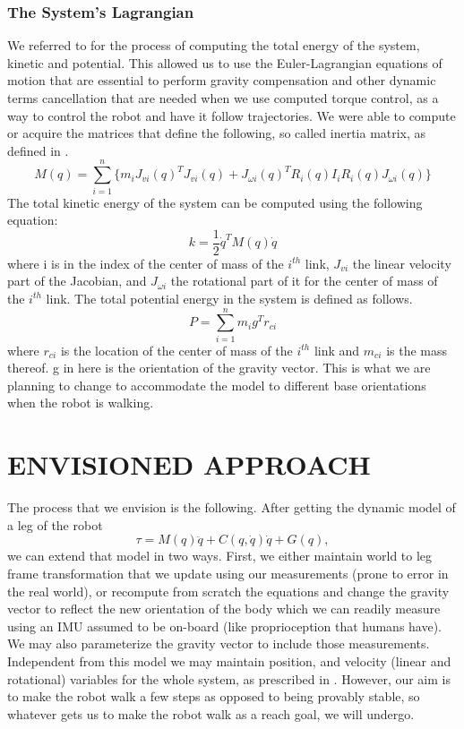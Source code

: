 \documentclass[letterpaper, 10 pt, conference]{ieeeconf}  %
\begin{document}
\subsubsection{The System's Lagrangian}
We referred to \cite{spong2006robot} for the process of computing the total energy of the system, kinetic and potential. This allowed us to use the Euler-Lagrangian equations of motion that are essential to perform gravity compensation and other dynamic terms cancellation that are needed when we use computed torque control, as a way to control the robot and have it follow trajectories.
We were able to compute or acquire the matrices that define the following, so called inertia matrix, as defined in \cite{spong2006robot}.
$$
M(q) = \sum_{i=1}^n \{m_i J_{vi}(q)^T J_{vi}(q) + J_{\omega i}(q)^T R_i(q) I_i R_i(q) J_{\omega i}(q)\}
$$
The total kinetic energy of the system can be computed using the following equation:
$$
k = \frac{1}{2} \dot{q}^T M(q)\dot{q}
$$
where i is in the index of the center of mass of the $i^{th}$ link, $J_{vi}$ the linear velocity part of the Jacobian, and  $J_{\omega i}$ the rotational part of it for the center of mass of the $i^{th}$ link.
The total potential energy in the system is defined as follows.
$$
P = \sum_{i=1}^n  m_i g^T r_{ci}
$$
where $r_{ci}$ is the location of the center of mass of the $i^{th}$ link and $m_{ci}$ is the mass thereof. g in here is the orientation of the gravity vector. This is what we are planning to change to accommodate the model to different base orientations when the robot is walking.

\section{ENVISIONED APPROACH}
The process that we envision is the following. After getting the dynamic model of a leg of the robot
$$
\tau = M(q)\ddot{q} + C(q,\dot{q})\dot{q} + G(q),
$$ we can extend that model in two ways.
First, we either maintain world to leg frame transformation that we update using our measurements (prone to error in the real world), or recompute from scratch the equations and change the gravity vector to reflect the new orientation of the body which we can readily measure using an IMU assumed to be on-board (like proprioception that humans have). We may also parameterize the gravity vector to include those measurements. Independent from this model we may maintain position, and velocity (linear and rotational) variables for the whole system, as prescribed in \cite{hardt2003dynamic}. However, our aim is to make the robot walk a few steps as opposed to being provably stable, so whatever gets us to make the robot walk as a reach goal, we will undergo.
\end{document}
